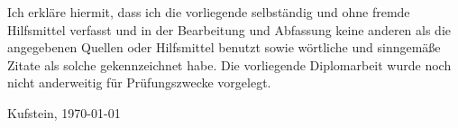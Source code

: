 \begingroup
{}
\onehalfspacing
\normalsize






Ich erkläre hiermit, dass ich die vorliegende \getThesis\xspace selbständig und ohne
fremde Hilfsmittel verfasst und in der Bearbeitung und Abfassung keine anderen als
die angegebenen Quellen oder Hilfsmittel benutzt sowie wörtliche und sinngemäße
Zitate als solche gekennzeichnet habe. Die vorliegende Diplomarbeit wurde noch
nicht anderweitig für Prüfungszwecke vorgelegt.

\vspace{1em}

Kufstein, \today

\vspace{3em}

\getAutor







\endgroup

